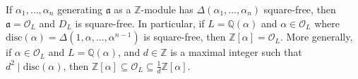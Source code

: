 \begin{corollary}
    If \( \alpha_1, \dots, \alpha_n \) generating \( \mathfrak a \) as a \( \mathbb Z \)-module has \( \Delta(\alpha_1, \dots, \alpha_n) \) square-free, then \( \mathfrak a = \mathcal O_L \) and \( D_L \) is square-free.
    In particular, if \( L = \mathbb Q(\alpha) \) and \( \alpha \in \mathcal O_L \) where \( \mathrm{disc}(\alpha) = \Delta(1, \alpha, \dots, \alpha^{n-1}) \) is square-free, then \( \mathbb Z[\alpha] = \mathcal O_L \).
    More generally, if \( \alpha \in \mathcal O_L \) and \( L = \mathbb Q(\alpha) \), and \( d \in \mathbb Z \) is a maximal integer such that \( d^2 \mid \mathrm{disc}(\alpha) \), then \( \mathbb Z[\alpha] \subseteq \mathcal O_L \subseteq \frac{1}{d} \mathbb Z[\alpha] \).
\end{corollary}

